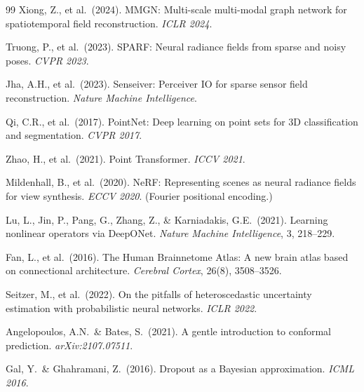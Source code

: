 \documentclass[11pt,letterpaper]{article}
\begin{document}
\begin{thebibliography}{99}
Xiong, Z., et al.\ (2024).
MMGN: Multi-scale multi-modal graph network for spatiotemporal field reconstruction.
\textit{ICLR 2024}.

Truong, P., et al.\ (2023).
SPARF: Neural radiance fields from sparse and noisy poses.
\textit{CVPR 2023}.

Jha, A.H., et al.\ (2023).
Senseiver: Perceiver IO for sparse sensor field reconstruction.
\textit{Nature Machine Intelligence}.

Qi, C.R., et al.\ (2017).
PointNet: Deep learning on point sets for 3D classification and segmentation.
\textit{CVPR 2017}.

Zhao, H., et al.\ (2021).
Point Transformer.
\textit{ICCV 2021}.

Mildenhall, B., et al.\ (2020).
NeRF: Representing scenes as neural radiance fields for view synthesis.
\textit{ECCV 2020}. (Fourier positional encoding.)

Lu, L., Jin, P., Pang, G., Zhang, Z., \& Karniadakis, G.E.\ (2021).
Learning nonlinear operators via DeepONet.
\textit{Nature Machine Intelligence}, 3, 218--229.

Fan, L., et al.\ (2016).
The Human Brainnetome Atlas: A new brain atlas based on connectional architecture.
\textit{Cerebral Cortex}, 26(8), 3508--3526.

Seitzer, M., et al.\ (2022).
On the pitfalls of heteroscedastic uncertainty estimation with probabilistic neural networks.
\textit{ICLR 2022}.

Angelopoulos, A.N.\ \& Bates, S.\ (2021).
A gentle introduction to conformal prediction.
\textit{arXiv:2107.07511}.

Gal, Y.\ \& Ghahramani, Z.\ (2016).
Dropout as a Bayesian approximation.
\textit{ICML 2016}.

\end{thebibliography}
\end{document}
